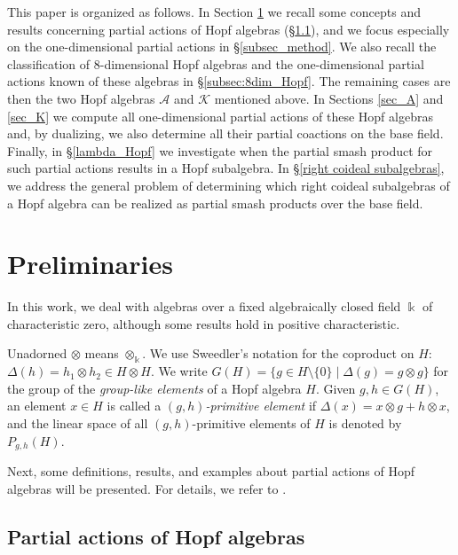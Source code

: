 \documentclass[reqno]{amsart}
\theoremstyle{definition}
\numberwithin{equation}{section}\theoremstyle{plain}
\theoremstyle{definition}
\def \o {\otimes}
\def \k {\Bbbk}
\def \K {\mathcal{K}}
\def \A {\mathcal{A}}
\begin{document}
This paper is organized as follows.
In Section \ref{sec:preliminaries} we recall some concepts and results concerning partial actions of Hopf algebras (\S \ref{subsec:partial_actions}), and we focus especially on the one-dimensional partial actions in \S \ref{subsec_method}. We also recall the classification of 8-dimensional Hopf algebras and the one-dimensional partial actions known of these algebras in \S \ref{subsec:8dim_Hopf}.
The remaining cases are then the two Hopf algebras $\A$ and $\K$ mentioned above.
In Sections \ref{sec_A} and \ref{sec_K} we compute all one-dimensional partial actions of these Hopf algebras and, by dualizing, we also determine all their partial coactions on the base field.
 Finally, in \S \ref{lambda_Hopf} we investigate when the partial smash product for such partial actions results in a Hopf subalgebra. In \S \ref{right coideal subalgebras}, we address the general problem of determining which right coideal subalgebras of a Hopf algebra can be realized as partial smash products over the base field.

\section{Preliminaries}\label{sec:preliminaries}

In this work, we deal with algebras over a fixed algebraically closed field $\k$ of characteristic zero, although some results hold in positive characteristic.

Unadorned $\otimes$ means $\otimes_{\k}$. We use Sweedler's notation for the coproduct on \(H\): \(\Delta(h) = h_1 \otimes h_2 \in H \otimes H\).
We write $G(H) = \{ g \in H\setminus \{0\} \mid \Delta(g)=g \o g\}$ for the group of the \emph{group-like elements} of a Hopf algebra $H$.
Given $g,h \in G(H)$, an element $x \in H$ is called a \emph{$(g,h)$-primitive element} if $\Delta(x) = x \o g + h \o x$, and the linear space of all $(g,h)$-primitive elements of $H$ is denoted by $P_{g,h}(H)$.

\medbreak

Next, some definitions, results, and examples about partial actions of Hopf algebras will be presented.
For details, we refer to \cites{Alvares_Alves_Batista, enveloping, caenepeel2008partial, guris, corresponding}.

\subsection{Partial actions of Hopf algebras}\label{subsec:partial_actions}
\end{document}
